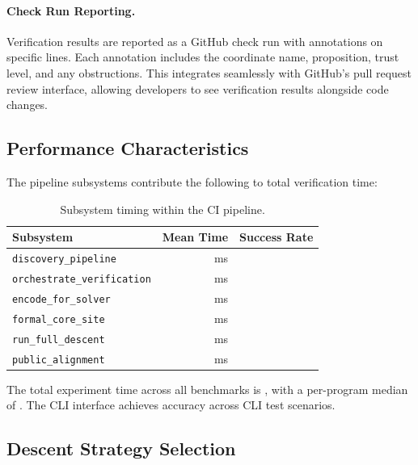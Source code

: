 \documentclass[11pt]{article}
\begin{document}
\paragraph{Check Run Reporting.}
Verification results are reported as a GitHub check run with annotations on
specific lines. Each annotation includes the coordinate name, proposition,
trust level, and any obstructions. This integrates seamlessly with GitHub's
pull request review interface, allowing developers to see verification
results alongside code changes.

\subsection{Performance Characteristics}

The pipeline subsystems contribute the following to total verification time:

\begin{table}[t]
\centering
\caption{Subsystem timing within the CI pipeline.}
\label{tab:subsystem-timing}
\begin{tabular}{lrr}
\toprule
\textbf{Subsystem} & \textbf{Mean Time} & \textbf{Success Rate} \\
\midrule
\texttt{discovery\_pipeline} & \compProfDiscoveryPipelineMeanMs{}\,ms &
  \compProfDiscoveryPipelineRate{} \\
\texttt{orchestrate\_verification} & \compProfOrchestrateVerificationMeanMs{}\,ms &
  \compProfOrchestrateVerificationRate{} \\
\texttt{encode\_for\_solver} & \compProfEncodeForSolverMeanMs{}\,ms &
  \compProfEncodeForSolverRate{} \\
\texttt{formal\_core\_site} & \compProfFormalCoreSiteMeanMs{}\,ms &
  \compProfFormalCoreSiteRate{} \\
\texttt{run\_full\_descent} & \compProfRunFullDescentMeanMs{}\,ms &
  \compProfRunFullDescentRate{} \\
\texttt{public\_alignment} & \compProfPublicAlignmentMeanMs{}\,ms &
  \compProfPublicAlignmentRate{} \\
\bottomrule
\end{tabular}
\end{table}

The total experiment time across all benchmarks is \subTotalExperimentTime{},
with a per-program median of \expTimeMedian{}. The CLI interface achieves
\subCliAccuracy{} accuracy across \subCliTotal{} CLI test scenarios.

\subsection{Descent Strategy Selection}
\end{document}
